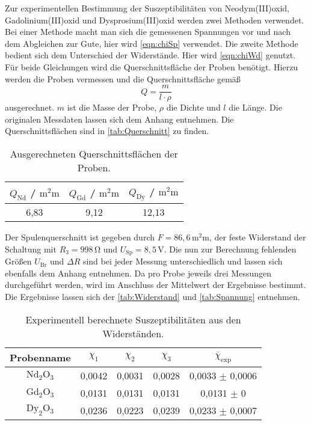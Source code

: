 Zur experimentellen Bestimmung der Suszeptibilitäten von Neodym(III)oxid, 
Gadolinium(III)oxid und Dysprosium(III)oxid werden zwei Methoden verwendet. 
Bei einer Methode macht man sich die gemessenen Spannungen vor und 
nach dem Abgleichen zur Gute, hier wird \autoref{eqn:chiSp} verwendet. Die zweite Methode
bedient sich dem Unterschied der Widerstände. Hier wird \autoref{eqn:chiWd} genutzt.\\
Für beide Gleichungen wird die Querschnittsfläche der Proben benötigt.
Hierzu werden die Proben vermessen und die Querschnittsfläche gemäß
\begin{equation*}
  Q = \frac{m}{l \cdot \rho}
\end{equation*}
ausgerechnet. $m$ ist die Masse der Probe, $\rho$ die Dichte und $l$ die Länge.
Die originalen Messdaten lassen sich dem Anhang entnehmen. Die Querschnittsflächen
sind in \autoref{tab:Querschnitt} zu finden.

\begin{table}
  \centering
  \caption{Ausgerechneten Querschnittsflächen der Proben.}
  \label{tab:Querschnitt}
  \begin{tabular}{c | c | c }
    \toprule
    $Q_{\mathrm{Nd}}$ / $\si{\square\milli\meter}$ & $Q_{\mathrm{Gd}}$ / $\si{\square\milli\meter}$ & $Q_{\mathrm{Dy}}$ / $\si{\square\milli\meter}$ \\
    \hline
    6,83 & 9,12 & 12,13 \\
    \midrule
    \bottomrule
  \end{tabular}
\end{table}

Der Spulenquerschnitt ist gegeben durch $F = 86,6 \, \si{\square\milli\meter}$, der feste
Widerstand der Schaltung mit $R_3 = 998\,  \si{\ohm}$ und $U_{\mathrm{Sp}}= 8,5 \, \si{\volt}$.
Die nun zur Berechnung fehlenden Größen
$U_{\mathrm{Br}}$ und $\Delta R$ sind bei jeder Messung unterschiedlich
und lassen sich ebenfalls dem Anhang entnehmen. Da pro Probe jeweils drei Messungen 
durchgeführt werden, wird im Anschluss der Mittelwert der Ergebnisse bestimmt. Die Ergebnisse
lassen sich der \autoref{tab:Widerstand} und \autoref{tab:Spannung} entnehmen.\\

\begin{table}
  \centering
  \caption{Experimentell berechnete Suszeptibilitäten aus den Widerständen.}
  \label{tab:Widerstand}
  \begin{tabular}{c || c | c | c || c }
    \toprule
    Probenname & $\chi_1$ & $\chi_2$ & $\chi_3$ & $\overline{\chi}_{\mathrm{exp}}$ \\
    \hline
    $\mathrm{Nd}_2 \mathrm{O}_3$ & 0,0042 & 0,0031 & 0,0028 & 0,0033 $\pm$ 0,0006 \\
    $\mathrm{Gd}_2 \mathrm{O}_3$ & 0,0131 & 0,0131 & 0,0131 & 0,0131 $\pm$ 0 \\
    $\mathrm{Dy}_2 \mathrm{O}_3$ & 0,0236 & 0,0223 & 0,0239 & 0,0233 $\pm$ 0,0007 \\
    \midrule
    \bottomrule
  \end{tabular}
\end{table}


